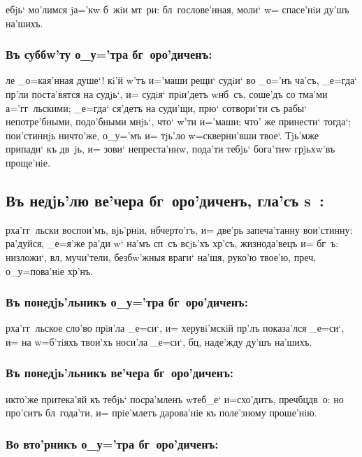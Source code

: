 \documentclass[14pt,twoside]{extreport}
\renewcommand{\*}{~~\raise3pt\hbox{\footnotesize*}}
\begin{document}
ебjь` мо'лимся jа='кw б~жiи мт~ри: бл~гослове'нная, моли` w= спасе'нiи
ду'шъ на'шихъ.

\subsubsection{Въ суббw'ту о_у='тра бг~оро'диченъ:}

ле _о=кая'нная душе`! кi'й w'тъ и='маши рещи` судiи` во _о='нъ
ча'съ, _е=гда` пр'ли поста'вятся на судjь`, и= судiя` прiи'детъ w\т нб~съ,
соше'дъ со тма'ми а='гг~льскими; _е=гда` ся'детъ на суди'щи, прю` сотвори'ти
съ рабы` непотре'бными, подо'бными мнjь`, что` w'ти и='маши; что' же
принести` тогда`; пои'стиннjь ничто'же, о_у='мъ и= тjь'ло w=скверни'вши
твое`. Тjь'мже припади` къ дв~jь, и= зови` непреста'ннw, пода'ти тебjь`
бога'тнw грjьхw'въ проще'нiе.

\delimpict

\subsection[Гла'съ s~]{Въ недjь'лю ве'чера бг~оро'диченъ, гла'съ s~:}

рха'гг~льски воспои'мъ, вjь'рнiи, нб черто'гъ, и= две'рь
запеча'танну вои'стинну: ра'дуйся, _е=я'же ра'ди w` на'мъ сп~съ всjь'хъ
хр'съ, жизнода'вецъ и= бг~ъ: низложи`, вл, мучи'тели, без\-бw'ж\-ныя
враги` на'шя, руко'ю твое'ю, преч, о_у=пова'нiе хр'нъ.

\subsubsection{Въ понедjь'льникъ о_у='тра бг~оро'диченъ:}

рха'гг~льское сло'во прiя'ла _е=си`, и= херувi'мскiй пр'лъ
показа'лся _е=си`, и= на w=б'тiяхъ тво\-и'хъ носи'ла _е=си`, бц, наде'жду
ду'шъ на'шихъ.

\subsubsection{Въ понедjь'льникъ ве'чера бг~оро'диченъ:}

икто'же притека'яй къ тебjь` посра'мленъ w\т теб_е` и=схо'дитъ,
преч бц дв~о: но про'ситъ бл~года'ти, и= прiе'млетъ дарова'нiе къ
поле'зному проше'нiю.

\subsubsection{Во вто'рникъ о_у='тра бг~оро'диченъ:}
\end{document}
